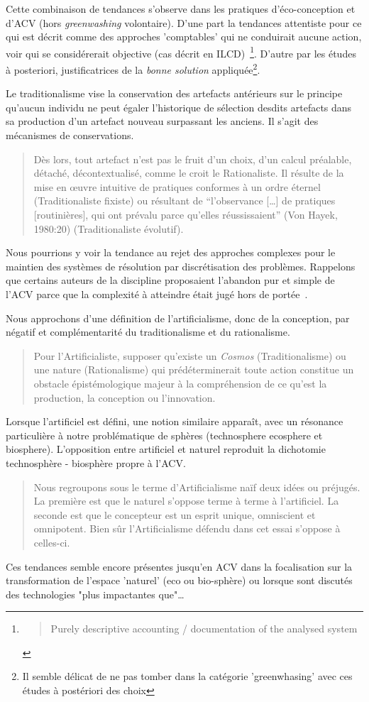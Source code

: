 Cette combinaison de tendances s'observe dans les pratiques d'éco-conception et d'ACV (hors \textit{greenwashing} volontaire).
D'une part la tendances attentiste pour ce qui est décrit comme des approches 'comptables' qui ne conduirait aucune action, voir qui se considérerait objective (cas décrit en ILCD)~\cite[5.3.7 Situation C, accouting]{european_commission_ilcd_2010}\footnote{
\blockcquote{european_commission_ilcd_2010}{
Purely descriptive accounting / documentation of the analysed system
}.
}.
D'autre par les études à posteriori, justificatrices de la \emph{bonne solution} appliquée\footnote{Il semble délicat de ne pas tomber dans la catégorie 'greenwhasing' avec ces études à postériori des choix}.

Le traditionalisme vise la conservation des artefacts antérieurs sur le principe qu'aucun individu ne peut égaler l'historique de sélection desdits artefacts dans sa production d'un artefact nouveau surpassant les anciens.
Il s'agit des mécanismes de conservations.
\blockcquote[Traditionalisme p.28]{micaelli_artificialisme:_2003}{
Dès lors, tout artefact n'est pas le fruit d'un choix, d'un calcul préalable, détaché, décontextualisé, comme le croit le Rationaliste.
Il résulte de la mise en œuvre intuitive de pratiques conformes à un ordre éternel (Traditionaliste fixiste) ou résultant de "`l'observance [\ldots] de pratiques [routinières], qui ont prévalu parce qu'elles réussissaient"' (Von Hayek, 1980:20) (Traditionaliste évolutif).
}
Nous pourrions y voir la tendance au rejet des approches complexes pour le maintien des systèmes de résolution par discrétisation des problèmes.
Rappelons que certains auteurs de la discipline proposaient l'abandon pur et simple de l'ACV parce que la complexité à atteindre était jugé hors de portée~\cite{bare_life_1999}.

Nous approchons d'une définition de l'artificialisme, donc de la conception, par négatif et complémentarité du traditionalisme et du rationalisme. 
\blockcquote[Traditionalisme p.35]{micaelli_artificialisme:_2003}{
Pour l'Artificialiste, supposer qu'existe un \textit{Cosmos} (Traditionalisme) ou une nature (Rationalisme) qui prédéterminerait toute action constitue un obstacle épistémologique majeur à la compréhension de ce qu'est la production, la conception ou l'innovation.
}
Lorsque l'artificiel est défini, une notion similaire apparaît, avec un résonance particulière à notre problématique de sphères (\gls{technosphere} \gls{ecosphere} et \gls{biosphere}). 
L'opposition entre artificiel et naturel reproduit la dichotomie technosphère - biosphère propre à l'\gls{ACV}.
\blockcquote[chapitre 3, p.39 3.1 Artificialisme naïf]{micaelli_artificialisme:_2003}{
Nous regroupons sous le terme d'Artificialisme naïf deux idées ou préjugés.
La première est que le naturel s'oppose terme à terme à l'artificiel.
La seconde est que le concepteur est un esprit unique, omniscient et omnipotent.
Bien sûr l'Artificialisme défendu dans cet essai s'oppose à celles-ci.
}
Ces tendances semble encore présentes jusqu'en ACV dans la focalisation sur la transformation de l'espace 'naturel' (eco ou bio-sphère) ou lorsque sont discutés des technologies "plus impactantes que"\ldots

